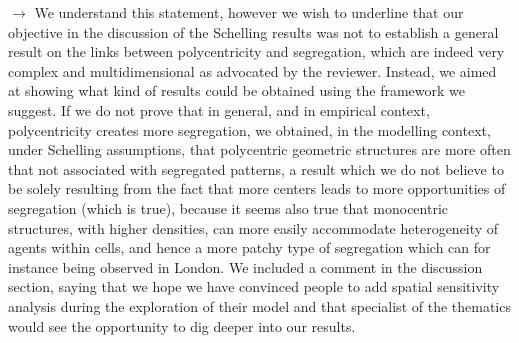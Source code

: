 \documentclass[11pt,a4paper,sans]{moderncv}        %
\begin{document}
\begin{enumerate}
 
  $\rightarrow$ We understand this statement, however we wish to underline that our objective in the discussion of the Schelling results was not to establish a general result on the links between polycentricity and segregation, which are indeed very complex and multidimensional as advocated by the reviewer. Instead, we aimed at showing what kind of results could be obtained using the framework we suggest. If we do not prove that in general, and in empirical context, polycentricity creates more segregation, we obtained, in the modelling context, under Schelling assumptions, that polycentric geometric structures are more often that not associated with segregated patterns, a result which we do not believe to be solely resulting from the fact that more centers leads to more opportunities of segregation (which is true), because it seems also true that monocentric structures, with higher densities, can more easily accommodate heterogeneity of agents within cells, and hence a more patchy type of segregation which can for instance being observed in London. We included a comment in the discussion section, saying that we hope we have convinced people to add spatial sensitivity analysis during the exploration of their model and that specialist of the thematics would see the opportunity to dig deeper into our results.
  




\end{enumerate}
\end{document}
